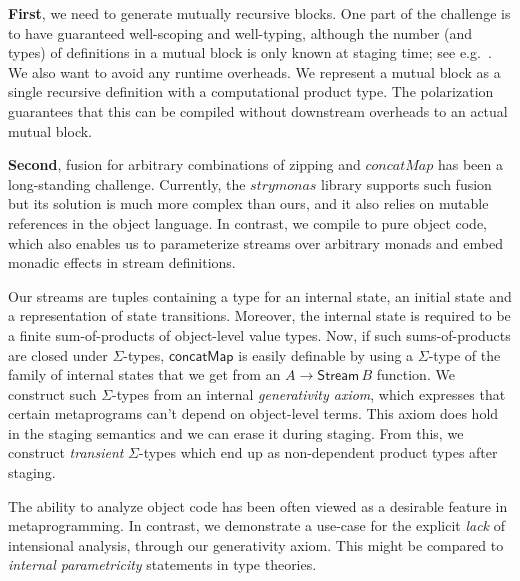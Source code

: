 \documentclass{easychair}
\renewcommand{\mit}[1]{{\mathit{#1}}}
\newcommand{\msf}[1]{{\mathsf{#1}}}
\newcommand{\concatMap}{\msf{concatMap}}
\theoremstyle{remark}
\begin{document}
\textbf{First}, we need to generate mutually recursive blocks. One part of the
challenge is to have guaranteed well-scoping and well-typing, although the
number (and types) of definitions in a mutual block is only known at staging
time; see e.g.\ \cite{DBLP:conf/pepm/YallopK19}. We also want to avoid any runtime
overheads. We represent a mutual block as a single recursive definition with a
computational product type. The polarization guarantees that this can be
compiled without downstream overheads to an actual mutual block.

\textbf{Second}, fusion for arbitrary combinations of zipping and
$\mit{concatMap}$ has been a long-standing challenge. Currently, the
$\mit{strymonas}$ library \cite{DBLP:conf/pepm/0001K24} supports such fusion
but its solution is much more complex than ours, and it also relies on mutable
references in the object language. In contrast, we compile to pure object
code, which also enables us to parameterize streams over arbitrary monads
and embed monadic effects in stream definitions.

Our streams are tuples containing a type for an internal state, an initial
state and a representation of state transitions. Moreover, the internal state is
required to be a finite sum-of-products of object-level value types. Now, if
such sums-of-products are closed under $\Sigma$-types, $\concatMap$ is easily
definable by using a $\Sigma$-type of the family of internal states that we get
from an $A \to \msf{Stream}\,B$ function. We construct such $\Sigma$-types from
an internal \emph{generativity axiom}, which expresses that certain metaprograms
can't depend on object-level terms. This axiom does hold in the staging
semantics and we can erase it during staging. From this, we construct
\emph{transient} $\Sigma$-types which end up as non-dependent product types
after staging.

The ability to analyze object code has been often viewed as a desirable feature
in metaprogramming. In contrast, we demonstrate a use-case for the explicit
\emph{lack} of intensional analysis, through our generativity axiom. This might
be compared to \emph{internal parametricity} statements in type theories.



\end{document}
